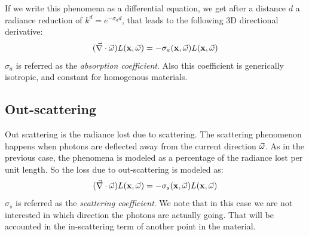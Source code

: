 If we write this phenomena as a differential equation, we get after a distance $d$ a radiance reduction of $k^d = e^{-\sigma_a d}$, that leads to the following 3D directional derivative:
$$
(\vec{\nabla} \cdot \vec{\omega}) L(\mathbf{x}, \vec{\omega}) = -\sigma_a(\mathbf{x},\vec{\omega}) L(\mathbf{x}, \vec{\omega})
$$
$\sigma_a$ is referred as the \emph{absorption coefficient}. Also this coefficient is generically isotropic, and constant for homogenous materials.

\subsection{Out-scattering}
Out scattering is the radiance lost due to scattering. The scattering phenomenon happens when photons are deflected away from the current direction $\vec{\omega}$.  As in the previous case, the phenomena is modeled as a percentage of the radiance lost per unit length. So the loss due to out-scattering is modeled as:
$$
(\vec{\nabla} \cdot \vec{\omega}) L(\mathbf{x}, \vec{\omega}) = -\sigma_s(\mathbf{x},\vec{\omega}) L(\mathbf{x}, \vec{\omega})
$$
$\sigma_s$ is referred as the \emph{scattering coefficient}. We note that in this case we are not interested in which direction the photons are actually going. That will be accounted in the in-scattering term of another point in the material.

